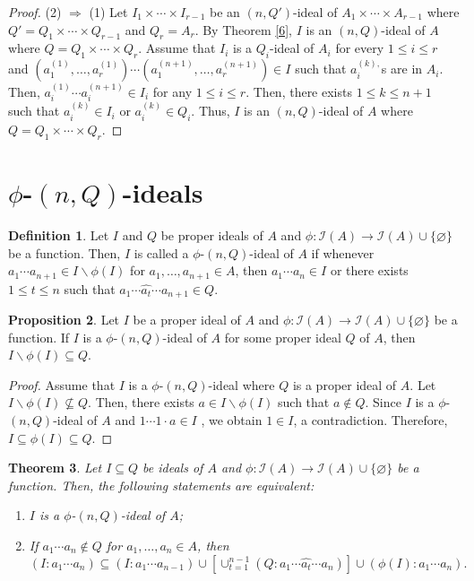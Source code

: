\documentclass[preprint,review,10pt]{amsart}
\newtheorem{theorem}{Theorem}[section]
\theoremstyle{definition}
\newtheorem{definition}[theorem]{Definition}
\newtheorem{proposition}[theorem]{Proposition}
\theoremstyle{remark}
\numberwithin{equation}{section}
\begin{document}
\begin{proof}
 (2) $\Longrightarrow$ (1) Let $I_1  \times \cdots \times I_{r-1}$ be an $(n,Q')$-ideal of $A_1 \times   \cdots \times A_{r-1}$ where $Q'=Q_1 \times \cdots \times Q_{r-1}$ and $Q_r = A_r$. By Theorem \ref{6}, $I$ is an $(n,Q)$-ideal of $A$ where $Q =Q_1 \times \cdots \times Q_{r}$. Assume that $I_i$ is a $Q_i$-ideal of $A_i$ for every $1 \le i \le r$ and 
 $(a_1^{(1)},\ldots,a_r^{(1)})\cdots( a_1^{(n+1)},\ldots,a_r^{(n+1)}) \in I$ such that $a^{(k),}_i$s are in $A_i$. Then, $a_i^{(1)}\cdots a_i^{(n+1)} \in I_i$ for any $1 \leq i \leq r$. Then, there exists $1 \leq k \leq n+1$ such that $a_i^{(k)} \in I_i$ or $a_i^{(k)} \in Q_i$. Thus, $I$ is an $(n,Q)$-ideal of $A$ where $Q =Q_1 \times \cdots \times Q_{r}$.
 \end{proof}
\section{$\phi$-$(n,Q)$-ideals}
\begin{definition}
Let $I$ and $ Q$  be proper ideals of $A$  and $\phi: \mathcal{I}(A) \to \mathcal{I}(A) \cup \{\varnothing\}$  be a function. Then, $I$ is called a $\phi$-$(n,Q)$-ideal of $A$ if whenever $a_1\cdots a_{n+1} \in I \backslash \phi(I)$ for $a_1,\ldots,a_{n+1} \in A$, then $a_1\cdots  a_n \in I$ or there exists $1 \leq t \leq n$ such that $a_1\cdots \widehat{a_t} \cdots a_{n+1} \in Q.$
\end{definition}
 \begin{proposition}  
Let $I $   be a proper ideal of $A$ and $\phi: \mathcal{I}(A) \to \mathcal{I}(A) \cup \{\varnothing\}$ be a function.   If $I$ is a $\phi$-$(n,Q)$-ideal of $A$ for    some  proper ideal $Q$ of $A$, then $I \backslash \phi(I)  \subseteq Q$.
\end{proposition}
\begin{proof}
Assume  that $I$ is a    $\phi$-$(n,Q)$-ideal where $Q$ is a proper ideal of $A$. Let  $ I \backslash \phi(I) \nsubseteq Q$. Then,    there exists $a \in I \backslash \phi(I)$ such that $a \notin Q$. Since $I$ is a  $\phi$-$(n,Q)$-ideal of $A$ and $1 \cdots 1\cdot  a\in I$ , we obtain $1  \in I$, a contradiction. Therefore, $I \subseteq \phi(I)  \subseteq Q$.
\end{proof}
\begin{theorem}
Let $I \subseteq Q$ be ideals of $A$ and $\phi: \mathcal{I}(A) \to \mathcal{I}(A) \cup \{\varnothing\}$ be a function. Then, the following statements are equivalent:
\begin{enumerate}
\item $I$ is a $\phi$-$(n,Q)$-ideal of $A$;
\item If $a_1 \cdots a_n \notin Q$ for $a_1,\ldots, a_n \in A$, then \[(I: a_1 \cdots a_n) \subseteq (I:a_1 \cdots a_{n-1}) \cup [\cup_{t=1}^{n-1}(Q:a_1 \cdots \widehat{a_t} \cdots a_n)] \cup (\phi(I):a_1 \cdots a_n).\]
\end{enumerate}
\end{theorem}
\end{document}
